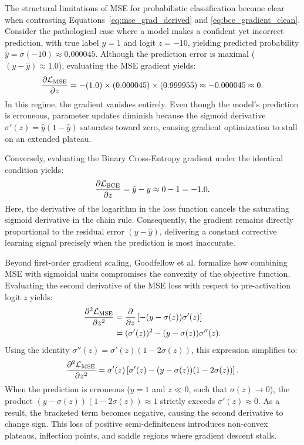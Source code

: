 \documentclass[../../main.tex]{subfiles}
\begin{document}
The structural limitations of MSE for probabilistic classification become clear when contrasting Equations~\eqref{eq:mse_grad_derived} and \eqref{eq:bce_gradient_clean}. Consider the pathological case where a model makes a confident yet incorrect prediction, with true label $y = 1$ and logit $z = -10$, yielding predicted probability $\hat{y} = \sigma(-10) \approx 0.000045$. Although the prediction error is maximal ($(y - \hat{y}) \approx 1.0$), evaluating the MSE gradient yields:
\[
\frac{\partial \mathcal{L}_{\text{MSE}}}{\partial z} = -(1.0) \times (0.000045) \times (0.999955) \approx -0.000045 \approx 0.
\]
In this regime, the gradient vanishes entirely. Even though the model's prediction is erroneous, parameter updates diminish because the sigmoid derivative $\sigma'(z) = \hat{y}(1 - \hat{y})$ saturates toward zero, causing gradient optimization to stall on an extended plateau.

Conversely, evaluating the Binary Cross-Entropy gradient under the identical condition yields:
\[
\frac{\partial \mathcal{L}_{\text{BCE}}}{\partial z} = \hat{y} - y \approx 0 - 1 = -1.0.
\]
Here, the derivative of the logarithm in the loss function cancels the saturating sigmoid derivative in the chain rule. Consequently, the gradient remains directly proportional to the residual error $(y - \hat{y})$, delivering a constant corrective learning signal precisely when the prediction is most inaccurate.

Beyond first-order gradient scaling, Goodfellow et al. \cite{goodfellow2016} formalize how combining MSE with sigmoidal units compromises the convexity of the objective function. Evaluating the second derivative of the MSE loss with respect to pre-activation logit $z$ yields:
\begin{align}
\frac{\partial^2 \mathcal{L}_{\text{MSE}}}{\partial z^2} &= \frac{\partial}{\partial z} \left[ - (y - \sigma(z)) \sigma'(z) \right] \nonumber \\
&= (\sigma'(z))^2 - (y - \sigma(z)) \sigma''(z).
\end{align}
Using the identity $\sigma''(z) = \sigma'(z)(1 - 2\sigma(z))$, this expression simplifies to:
\begin{equation}
\label{eq:mse_second_derivative}
\frac{\partial^2 \mathcal{L}_{\text{MSE}}}{\partial z^2} = \sigma'(z) \left[ \sigma'(z) - (y - \sigma(z))(1 - 2\sigma(z)) \right].
\end{equation}
When the prediction is erroneous ($y = 1$ and $z \ll 0$, such that $\sigma(z) \to 0$), the product $(y - \sigma(z))(1 - 2\sigma(z)) \approx 1$ strictly exceeds $\sigma'(z) \approx 0$. As a result, the bracketed term becomes negative, causing the second derivative to change sign. This loss of positive semi-definiteness introduces non-convex plateaus, inflection points, and saddle regions where gradient descent stalls.
\end{document}
